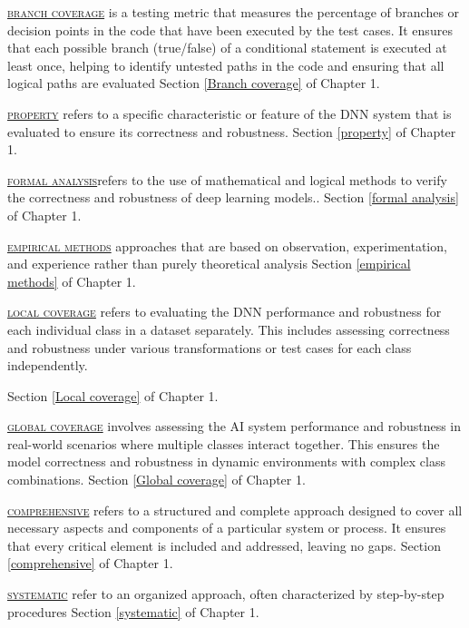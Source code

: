   \textsc{\hyperref[Branch coverage]{\textsc{branch coverage}}} is a testing metric that measures the percentage of branches or decision points in the code that have been executed by the test cases. It ensures that each possible branch (true/false) of a conditional statement is executed at least once, helping to identify untested paths in the code and ensuring that all logical paths are evaluated Section \ref{Branch coverage} of Chapter 1.


  \textsc{\hyperref[property]{\textsc{property}}} refers to a specific characteristic or feature of the DNN system that is evaluated to ensure its correctness and robustness.
  Section \ref{property} of Chapter 1.
  
  \textsc{\hyperref[formal analysis]{\textsc{formal analysis}}}refers to the use of mathematical and logical methods to verify the correctness and robustness of deep learning models.. Section \ref{formal analysis} of Chapter 1.
 

  \textsc{\hyperref[empirical methods]{\textsc{empirical methods}}}
  approaches that are based on observation, experimentation, and experience rather than purely theoretical analysis Section \ref{empirical methods} of Chapter 1.

  \textsc{\hyperref[Local coverage]{\textsc{local coverage}}}
  refers to evaluating the DNN performance and robustness for each individual class in a dataset separately. This includes assessing  correctness and robustness under various transformations or test cases for each class independently.

  Section \ref{Local coverage} of Chapter 1.

  \textsc{\hyperref[Global coverage]{\textsc{global coverage}}}
  involves assessing the AI system performance and robustness in real-world scenarios where multiple classes interact together. This ensures the model correctness and robustness in dynamic environments with complex class combinations. Section \ref{Global coverage} of Chapter 1.


\textsc{\hyperref[comprehensive]{\textsc{comprehensive}}}  refers to a structured and complete approach designed to cover all necessary aspects and components of a particular system or process. It ensures that every critical element is included and addressed, leaving no gaps. Section \ref{comprehensive} of Chapter 1.
  
\textsc{\hyperref[systematic]{\textsc{systematic}}} refer to an organized approach, often characterized by step-by-step procedures Section \ref{systematic} of Chapter 1.





